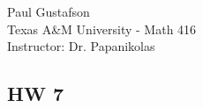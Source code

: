 \documentclass{article}
\begin{document}
\noindent Paul Gustafson\\
\noindent Texas A\&M University - Math 416\\
\noindent Instructor: Dr. Papanikolas

\subsection*{HW 7}

\end{document}
